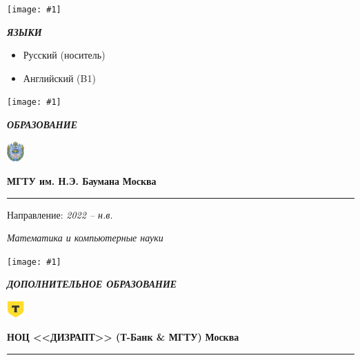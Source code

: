 \documentclass[a4paper, 10pt]{extarticle}
\newcommand{\Scale}{1.25}
\newcommand{\Sep}{
    \noindent\hdashrule[0.5ex]{\columnwidth}{1pt}{1mm 1pt}
}
\newcommand{\SubTitle}[2]{
    \parbox{1.75em}{
        \texttt{[image: \#1]}
    }\textbf{\textit{\MakeUppercase{#2}}}
}
\begin{document}
\begin{paracol}{2}
\begin{leftcolumn}
            \Sep
            \begin{center}
                \SubTitle{img/languages.png}{Языки}
            \end{center}
            \vspace{-1em}
            \begin{itemize}[
                label=\textcolor{black}{\scalebox{\Scale}{\textbullet}},
                topsep=0cm,
                leftmargin=0.275cm,
                itemsep=0.1cm
            ]
                \item Русский (носитель)
                \item Английский (B1)
            \end{itemize}
        \end{leftcolumn}

        \switchcolumn[1]
        \begin{rightcolumn}
            
            \Sep
            \begin{center}
                \SubTitle{img/education.png}{Образование}
            \end{center}
            \vspace{-1em}
            \noindent\parbox{0.1\columnwidth}{
                \includegraphics[width=0.05\textwidth]{img/bmstu_logo.png}
            }
            \parbox{0.89\columnwidth}{
                \textbf{МГТУ им. Н.Э. Баумана}
                \hfill \textbf{Москва}
                \hrule
                \vspace{0.5em}

                Направление: \hfill \textit{2022 -- н.в.} 
                
                \textit{Математика и компьютерные науки}
            }

            \Sep
            \begin{center}
                \SubTitle{img/sec_edu.png}{Дополнительное образование}
            \end{center}
            \vspace{-1em}
            \noindent\parbox{0.09\columnwidth}{
                \includegraphics[width=0.05\textwidth]{img/tbank_logo.png}
            }
            \parbox{0.9\columnwidth}{
                \textbf{НОЦ <<ДИЗРАПТ>> (Т-Банк \& МГТУ)}
                \hfill \textbf{Москва}
                \hrule
                \vspace{0.5em}

}
\end{rightcolumn}
\end{paracol}
\end{document}
